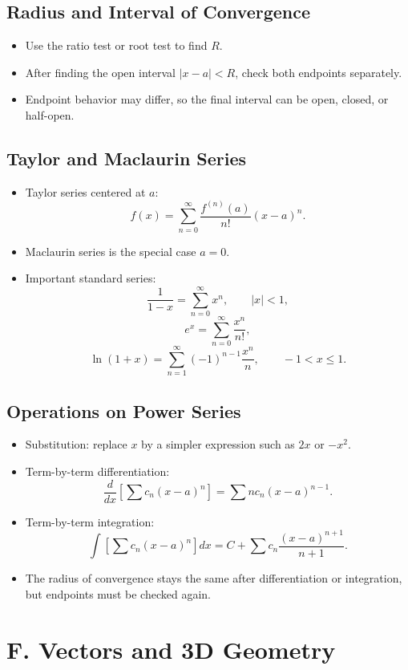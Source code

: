 \documentclass[11pt]{article}
\begin{document}
\subsection{Radius and Interval of Convergence}
\begin{itemize}
  \item Use the ratio test or root test to find $R$.
  \item After finding the open interval $|x-a|<R$, check both endpoints separately.
  \item Endpoint behavior may differ, so the final interval can be open, closed, or half-open.
\end{itemize}

\subsection{Taylor and Maclaurin Series}
\begin{itemize}
  \item Taylor series centered at $a$:
  \[
  f(x)=\sum_{n=0}^\infty \frac{f^{(n)}(a)}{n!}(x-a)^n.
  \]
  \item Maclaurin series is the special case $a=0$.
  \item Important standard series:
  \[
  \frac{1}{1-x}=\sum_{n=0}^\infty x^n,\qquad |x|<1,
  \]
  \[
  e^x=\sum_{n=0}^\infty \frac{x^n}{n!},
  \]
  \[
  \ln(1+x)=\sum_{n=1}^\infty (-1)^{n-1}\frac{x^n}{n},\qquad -1<x\le 1.
  \]
\end{itemize}

\subsection{Operations on Power Series}
\begin{itemize}
  \item Substitution: replace $x$ by a simpler expression such as $2x$ or $-x^2$.
  \item Term-by-term differentiation:
  \[
  \frac{d}{dx}\left[\sum c_n(x-a)^n\right]=\sum n c_n(x-a)^{n-1}.
  \]
  \item Term-by-term integration:
  \[
  \int \left[\sum c_n(x-a)^n\right]dx=C+\sum c_n\frac{(x-a)^{n+1}}{n+1}.
  \]
  \item The radius of convergence stays the same after differentiation or integration, but endpoints must be checked again.
\end{itemize}

\section{F. Vectors and 3D Geometry}
\end{document}
